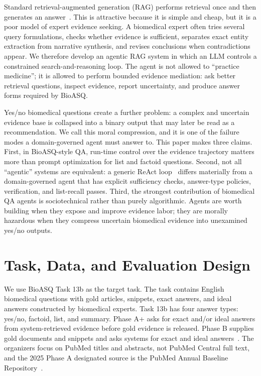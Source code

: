 \documentclass[sigconf,anonymous,review]{acmart}
\begin{document}
Standard retrieval-augmented generation (RAG) performs retrieval once and then generates an answer~\cite{lewis2020retrieval}. This is attractive
because it is simple and cheap, but it is a poor model of expert evidence seeking. A biomedical expert often tries several query formulations, checks whether evidence is sufficient, separates exact entity
extraction from narrative synthesis, and revises conclusions when
contradictions appear. We therefore develop an agentic RAG system
in which an LLM controls a constrained search-and-reasoning loop.
The agent is not allowed to ``practice medicine''; it is allowed to
perform bounded evidence mediation: ask better retrieval questions,
inspect evidence, report uncertainty, and produce answer forms
required by BioASQ.

Yes/no biomedical questions create a further problem: a complex and uncertain evidence base is collapsed into a binary output
that may later be read as a recommendation. We call this moral
compression, and it is one of the failure modes a domain-governed
agent must answer to. This paper makes three claims. First, in
BioASQ-style QA, run-time control over the evidence trajectory
matters more than prompt optimization for list and factoid questions. Second, not all ``agentic'' systems are equivalent: a generic
ReAct loop~\cite{yao2023react} differs materially from a domain-governed agent
that has explicit sufficiency checks, answer-type policies, verification, and list-recall passes. Third, the strongest contribution of
biomedical QA agents is sociotechnical rather than purely algorithmic. Agents are worth building when they expose and improve
evidence labor; they are morally hazardous when they compress
uncertain biomedical evidence into unexamined yes/no outputs.

\section{Task, Data, and Evaluation Design}

We use BioASQ Task 13b as the target task. The task contains English biomedical questions with gold articles, snippets, exact answers,
and ideal answers constructed by biomedical experts. Task 13b has
four answer types: yes/no, factoid, list, and summary. Phase A+
asks for exact and/or ideal answers from system-retrieved evidence
before gold evidence is released. Phase B supplies gold documents
and snippets and asks systems for exact and ideal answers~\cite{bioasq2026}. The
organizers focus on PubMed titles and abstracts, not PubMed Central full text, and the 2025 Phase A designated source is the PubMed
Annual Baseline Repository~\cite{bioasq2026}.
\end{document}
